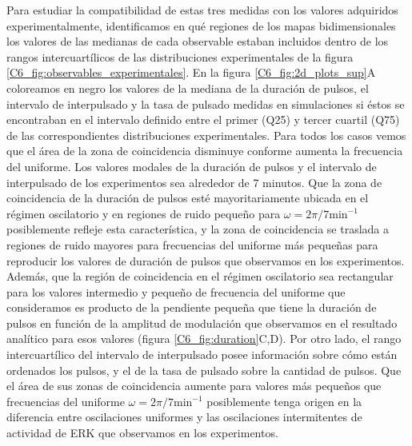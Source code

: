 \documentclass[./main.tex]{subfiles}
\begin{document}
Para estudiar la compatibilidad de estas tres medidas con los valores adquiridos experimentalmente, identificamos en qué regiones de los mapas bidimensionales los valores de las medianas de cada observable estaban incluidos dentro de los rangos intercuartílicos de las distribuciones experimentales de la figura \ref{C6_fig:observables_experimentales}. En la figura \ref{C6_fig:2d_plots_sup}A coloreamos en negro los valores de la mediana de la duración de pulsos, el intervalo de interpulsado y la tasa de pulsado medidas en simulaciones si éstos se encontraban en el intervalo definido entre el primer (Q25) y tercer cuartil (Q75) de las correspondientes distribuciones experimentales. Para todos los casos vemos que el área de la zona de coincidencia disminuye conforme aumenta la frecuencia del uniforme. Los valores modales de la duración de pulsos y el intervalo de interpulsado de los experimentos sea alrededor de 7 minutos. Que la zona de coincidencia de la duración de pulsos esté mayoritariamente ubicada en el régimen oscilatorio y en regiones de ruido pequeño para $\omega = 2\pi/7 \text{min}^{-1}$ posiblemente refleje esta característica, y la zona de coincidencia se traslada a regiones de ruido mayores para frecuencias del uniforme más pequeñas para reproducir los valores de duración de pulsos que observamos en los experimentos. Además, que la región de coincidencia en el régimen oscilatorio sea rectangular para los valores intermedio y pequeño de frecuencia del uniforme que consideramos es producto de la pendiente pequeña que tiene la duración de pulsos en función de la amplitud de modulación que observamos en el resultado analítico para esos valores (figura \ref{C6_fig:duration}C,D). Por otro lado, el rango intercuartílico del intervalo de interpulsado posee información sobre cómo están ordenados los pulsos, y el de la tasa de pulsado sobre la cantidad de pulsos. Que el área de sus zonas de coincidencia aumente para valores más pequeños que frecuencias del uniforme $\omega = 2\pi/7 \text{min}^{-1}$ posiblemente tenga origen en la diferencia entre oscilaciones uniformes y las oscilaciones intermitentes de actividad de ERK que observamos en los experimentos.  
\end{document}
